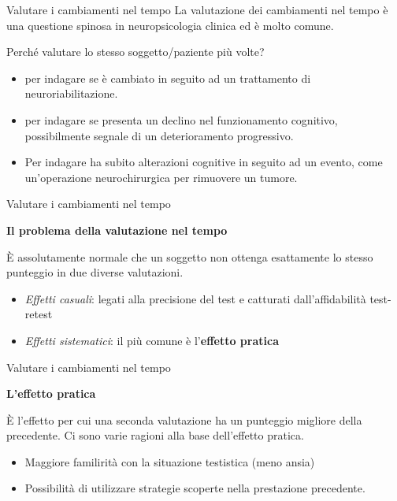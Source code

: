 \documentclass[
  ignorenonframetext,
]{beamer}
\begin{document}
\begin{frame}{Valutare i cambiamenti nel tempo}
\label{valutare-i-cambiamenti-nel-tempo}
La valutazione dei cambiamenti nel tempo è una questione spinosa in
neuropsicologia clinica ed è molto comune.

Perché valutare lo stesso soggetto/paziente più volte?

\begin{itemize}
\item
  per indagare se è cambiato in seguito ad un trattamento di
  neuroriabilitazione.
\item
  per indagare se presenta un declino nel funzionamento cognitivo,
  possibilmente segnale di un deterioramento progressivo.
\item
  Per indagare ha subito alterazioni cognitive in seguito ad un evento,
  come un'operazione neurochirurgica per rimuovere un tumore.
\end{itemize}
\end{frame}

\begin{frame}{Valutare i cambiamenti nel tempo}
\label{valutare-i-cambiamenti-nel-tempo-1}
\begin{center}
  \textbf{Il problema della valutazione nel tempo}
\end{center}
\vspace{2em}

È assolutamente normale che un soggetto non ottenga esattamente lo
stesso punteggio in due diverse valutazioni.

\begin{itemize}
\item
  \emph{Effetti casuali}: legati alla precisione del test e catturati
  dall'affidabilità test-retest
\item
  \emph{Effetti sistematici}: il più comune è l'\textbf{effetto pratica}
\end{itemize}
\end{frame}

\begin{frame}{Valutare i cambiamenti nel tempo}
\label{valutare-i-cambiamenti-nel-tempo-2}
\begin{center}
  \textbf{L'effetto pratica}
\end{center}
\vspace{1em}

È l'effetto per cui una seconda valutazione ha un punteggio migliore
della precedente. Ci sono varie ragioni alla base dell'effetto pratica.

\begin{itemize}
\item
  Maggiore familirità con la situazione testistica (meno ansia)
\item
  Possibilità di utilizzare strategie scoperte nella prestazione
  precedente.
\end{itemize}
\end{frame}
\end{document}
